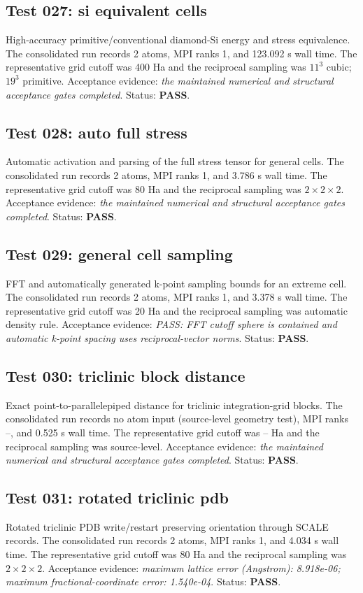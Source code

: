 \documentclass[aps,prb,preprint,superscriptaddress,longbibliography,floatfix]{revtex4-2}
\begin{document}
\subsection{Test 027: si equivalent cells}
High-accuracy primitive/conventional diamond-Si energy and stress equivalence. The consolidated run records 2 atoms, MPI ranks 1, and 123.092 s wall time. The representative grid cutoff was 400 Ha and the reciprocal sampling was $11^3$ cubic; $19^3$ primitive. Acceptance evidence: \emph{the maintained numerical and structural acceptance gates completed}. Status: \textbf{PASS}.

\subsection{Test 028: auto full stress}
Automatic activation and parsing of the full stress tensor for general cells. The consolidated run records 2 atoms, MPI ranks 1, and 3.786 s wall time. The representative grid cutoff was 80 Ha and the reciprocal sampling was $2\times2\times2$. Acceptance evidence: \emph{the maintained numerical and structural acceptance gates completed}. Status: \textbf{PASS}.

\subsection{Test 029: general cell sampling}
FFT and automatically generated k-point sampling bounds for an extreme cell. The consolidated run records 2 atoms, MPI ranks 1, and 3.378 s wall time. The representative grid cutoff was 20 Ha and the reciprocal sampling was automatic density rule. Acceptance evidence: \emph{PASS: FFT cutoff sphere is contained and automatic k-point spacing uses reciprocal-vector norms}. Status: \textbf{PASS}.

\subsection{Test 030: triclinic block distance}
Exact point-to-parallelepiped distance for triclinic integration-grid blocks. The consolidated run records no atom input (source-level geometry test), MPI ranks --, and 0.525 s wall time. The representative grid cutoff was -- Ha and the reciprocal sampling was source-level. Acceptance evidence: \emph{the maintained numerical and structural acceptance gates completed}. Status: \textbf{PASS}.

\subsection{Test 031: rotated triclinic pdb}
Rotated triclinic PDB write/restart preserving orientation through SCALE records. The consolidated run records 2 atoms, MPI ranks 1, and 4.034 s wall time. The representative grid cutoff was 80 Ha and the reciprocal sampling was $2\times2\times2$. Acceptance evidence: \emph{maximum lattice error (Angstrom): 8.918e-06; maximum fractional-coordinate error: 1.540e-04}. Status: \textbf{PASS}.
\end{document}

